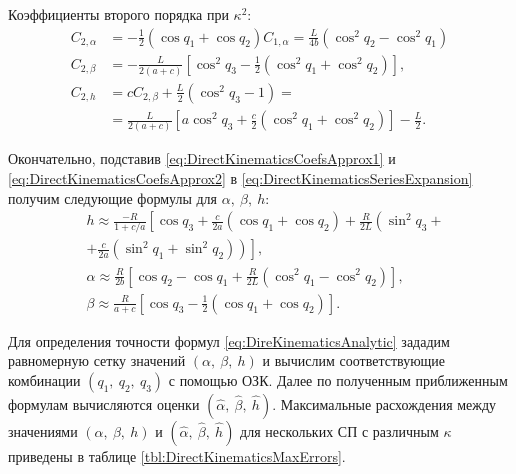 Коэффициенты второго порядка при $\kappa^2$:
\begin{equation}
\label{eq:DirectKinematicsCoefsApprox2}
\begin{aligned}
	C_{2,\alpha} & = - \frac{1}{2}\left(\cos{q_1} + \cos{q_2}\right)C_{1,\alpha}=\frac{L}{4b}\left(\cos^2{q_2} - \cos^2{q_1}\right)\\
	C_{2,\beta} & = -\frac{L}{2\left(a+c\right)}\left[\cos^2{q_3} - \frac{1}{2}\left(\cos^2{q_1} + \cos^2{q_2}\right)\right],\\
	C_{2,h} & = cC_{2,\beta} + \frac{L}{2}\left(\cos^2{q_3} - 1\right) = \\
	& = \frac{L}{2\left(a+c\right)}\left[a\cos^2{q_3} + \frac{c}{2}\left(\cos^2{q_1} + \cos^2{q_2}\right)\right] - \frac{L}{2}.
\end{aligned}
\end{equation}

Окончательно, подставив \ref{eq:DirectKinematicsCoefsApprox1} и \ref{eq:DirectKinematicsCoefsApprox2} в \ref{eq:DirectKinematicsSeriesExpansion} получим следующие формулы для $\alpha,~\beta,~h$:
\begin{equation}
\label{eq:DireKinematicsAnalytic}
\begin{aligned}
	& h \approx \frac{-R}{1+c/a}\left[\cos{q_3} + \frac{c}{2a}\left(\cos{q_1} + \cos{q_2}\right) + \frac{R}{2L}\left(\sin^2{q_3} + \right.\right.\\
	& \left.\left. + \frac{c}{2a}\left(\sin^2{q_1} + \sin^2{q_2}\right)\right)\right], \\
	& \alpha \approx \frac{R}{2b}\left[\cos{q_2}-\cos{q_1} + \frac{R}{2L}\left(\cos^2{q_1}-\cos^2{q_2}\right)\right],\\
	& \beta \approx \frac{R}{a+c}\left[\cos{q_3} - \frac{1}{2}\left(\cos{q_1} + \cos{q_2}\right)\right].
\end{aligned}
\end{equation}

Для определения точности формул \ref{eq:DireKinematicsAnalytic} зададим равномерную сетку значений $\left(\alpha,~\beta,~h\right)$ и вычислим соответствующие комбинации $\left(q_1,~q_2,~q_3\right)$ с помощью ОЗК. Далее по полученным приближенным формулам вычисляются оценки $(\hat{\alpha},~\hat{\beta},~\hat{h})$. Максимальные расхождения между значениями $\left(\alpha,~\beta,~h\right)$ и $(\hat{\alpha},~\hat{\beta},~\hat{h})$ для нескольких СП с различным $\kappa$ приведены в таблице \ref{tbl:DirectKinematicsMaxErrors}.

